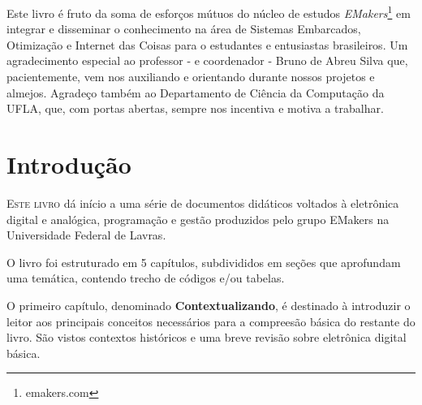 \documentclass[
	10pt,				%
	openright,			%
	twoside,			%
	a5paper,			%
	english,			%
	french,				%
	spanish,			%
	brazil,				%
	sumario=tradicional
]{abntex2}
\renewcommand{\textual}{%
  \pagestyle{abntbookheadings}%
  \aliaspagestyle{chapter}{abntbookchapfirst}%
  \nouppercaseheads%
  \bookmarksetup{startatroot}%
}
\begin{document}
\begin{agradecimentos}
Este livro é fruto da soma de esforços mútuos do núcleo de estudos \textit{EMakers}\footnote{emakers.com} em integrar e disseminar o conhecimento na área de Sistemas Embarcados, Otimização e Internet das Coisas para o estudantes e entusiastas brasileiros. Um agradecimento especial ao professor - e coordenador - Bruno de Abreu Silva que, pacientemente, vem nos auxiliando e orientando durante nossos projetos e almejos. Agradeço também ao Departamento de Ciência da Computação da UFLA, que, com portas abertas, sempre nos incentiva e motiva a trabalhar.
\end{agradecimentos}

\listoffigures*
\cleardoublepage

\listoftables*
\cleardoublepage

\tableofcontents*
\cleardoublepage

\mainmatter

\chapter*[Introdução]{Introdução}

\lettrine[nindent=0.35em,lhang=0.40,loversize=0.3]{E}{ste livro} dá início a uma
série de documentos didáticos voltados à eletrônica digital e analógica, programação e gestão produzidos pelo grupo EMakers na Universidade Federal de Lavras. 

O livro foi estruturado em 5 capítulos, subdivididos em seções que aprofundam uma temática, contendo trecho de códigos e/ou tabelas.

O primeiro capítulo, denominado \textsf{\textbf{Contextualizando}}, é destinado à introduzir o leitor aos principais conceitos necessários para a compreesão básica do restante do livro. São vistos contextos históricos e uma breve revisão sobre eletrônica digital básica.
\end{document}
